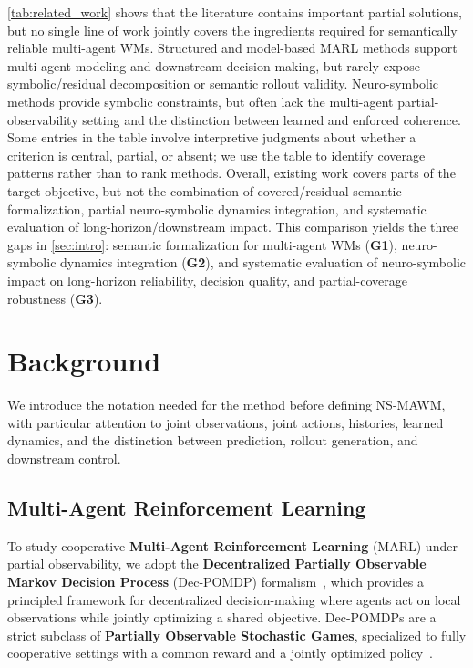 \documentclass{article}
\theoremstyle{plain}
\theoremstyle{definition}
\theoremstyle{remark}
\begin{document}
\autoref{tab:related_work} shows that the literature contains important partial solutions, but no single line of work jointly covers the ingredients required for semantically reliable multi-agent WMs. Structured and model-based MARL methods support multi-agent modeling and downstream decision making, but rarely expose symbolic/residual decomposition or semantic rollout validity. Neuro-symbolic methods provide symbolic constraints, but often lack the multi-agent partial-observability setting and the distinction between learned and enforced coherence. Some entries in the table involve interpretive judgments about whether a criterion is central, partial, or absent; we use the table to identify coverage patterns rather than to rank methods. Overall, existing work covers parts of the target objective, but not the combination of covered/residual semantic formalization, partial neuro-symbolic dynamics integration, and systematic evaluation of long-horizon/downstream impact. This comparison yields the three gaps in \autoref{sec:intro}: semantic formalization for multi-agent WMs (\textbf{G1}), neuro-symbolic dynamics integration (\textbf{G2}), and systematic evaluation of neuro-symbolic impact on long-horizon reliability, decision quality, and partial-coverage robustness (\textbf{G3}).


\section{Background}
\label{sec:background}

We introduce the notation needed for the method before defining NS-MAWM, with particular attention to joint observations, joint actions, histories, learned dynamics, and the distinction between prediction, rollout generation, and downstream control.

\subsection{Multi-Agent Reinforcement Learning}
\label{sec:decpomdp}

To study cooperative \textbf{Multi-Agent Reinforcement Learning} (MARL) under partial observability, we adopt the \textbf{Decentralized Partially Observable Markov Decision Process} (Dec-POMDP) formalism~\cite{Oliehoek2016}, which provides a principled framework for decentralized decision-making where agents act on local observations while jointly optimizing a shared objective.
Dec-POMDPs are a strict subclass of \textbf{Partially Observable Stochastic Games}, specialized to fully cooperative settings with a common reward and a jointly optimized policy~\cite{Beynier2013}.
\end{document}
